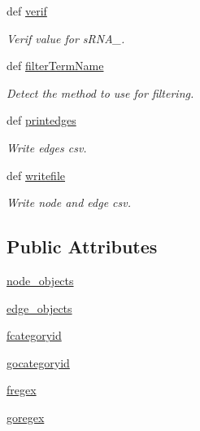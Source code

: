 \begin{DoxyCompactItemize}
def \hyperlink{classirna_1_1David2tulip_1_1Graph_1_1Graph_abcf96f7bc85335f73687ac3f76f3bfa2}{verif}
\begin{DoxyCompactList}\small\item\em \-Verif value for s\-R\-N\-A\-\_. \end{DoxyCompactList}\item 
def \hyperlink{classirna_1_1David2tulip_1_1Graph_1_1Graph_a50c8017620ee61ef6b5ec209c45de220}{filter\-Term\-Name}
\begin{DoxyCompactList}\small\item\em \-Detect the method to use for filtering. \end{DoxyCompactList}\item 
def \hyperlink{classirna_1_1David2tulip_1_1Graph_1_1Graph_a2e8296d789c3281c33c26e264c0b0759}{printedges}
\begin{DoxyCompactList}\small\item\em \-Write edges csv. \end{DoxyCompactList}\item 
def \hyperlink{classirna_1_1David2tulip_1_1Graph_1_1Graph_a90ff43c3e5b53a600d815254a61b2b8d}{writefile}
\begin{DoxyCompactList}\small\item\em \-Write node and edge csv. \end{DoxyCompactList}\end{DoxyCompactItemize}
\subsection*{\-Public \-Attributes}
\begin{DoxyCompactItemize}
\item 
\hyperlink{classirna_1_1David2tulip_1_1Graph_1_1Graph_a4075e68c0e02ec82a3178e35eba24c86}{node\-\_\-objects}
\item 
\hyperlink{classirna_1_1David2tulip_1_1Graph_1_1Graph_a5a6d96783e9c34133fefcc2308e62af6}{edge\-\_\-objects}
\item 
\hyperlink{classirna_1_1David2tulip_1_1Graph_1_1Graph_aa0fb65a235c25225786610d239ec90e1}{fcategoryid}
\item 
\hyperlink{classirna_1_1David2tulip_1_1Graph_1_1Graph_ae1175a4df976ca68690ceea397fcfd09}{gocategoryid}
\item 
\hyperlink{classirna_1_1David2tulip_1_1Graph_1_1Graph_aa84d21d0e3d49cc31324ace30db99cb5}{fregex}
\item 
\hyperlink{classirna_1_1David2tulip_1_1Graph_1_1Graph_ad29059e4f3b11c5f723a631168255cc6}{goregex}
\end{DoxyCompactItemize}


